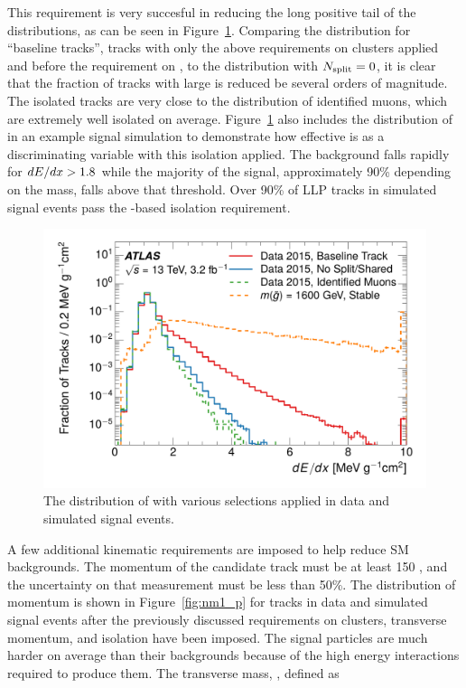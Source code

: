 This requirement is very succesful in reducing the long positive tail of the \dedx distributions, as can be seen in Figure~\ref{fig:dedx_isolation}.
Comparing the distribution for ``baseline tracks'', tracks with only the above requirements on clusters applied and before the requirement on \Nsplit, to the distribution with $N_{\mathrm{split}} = 0$, it is clear that the fraction of tracks with large \dedx is reduced be several orders of magnitude.
The isolated tracks are very close to the \dedx distribution of identified muons, which are extremely well isolated on average. 
Figure~\ref{fig:dedx_isolation} also includes the distribution of \dedx in an example signal simulation to demonstrate how effective \dedx is as a discriminating variable with this isolation applied. 
The background falls rapidly for $dE/dx > 1.8$ \MeVgcm while the majority of the signal, approximately 90\% depending on the mass, falls above that threshold.
Over 90\% of \ac{LLP} tracks in simulated signal events pass the \Nsplit-based isolation requirement.


\begin{figure}[h]
\centering
\includegraphics[width=\fullfig]{figures/dedx_isolation.pdf}
\caption{The distribution of \dedx with various selections applied in data and simulated signal events.}
\label{fig:dedx_isolation}
\end{figure}

A few additional kinematic requirements are imposed to help reduce \ac{SM} backgrounds. 
The momentum of the candidate track must be at least 150 \GeV, and the uncertainty on that measurement must be less than 50\%. 
The distribution of momentum is shown in Figure~\ref{fig:nm1_p} for tracks in data and simulated signal events after the previously discussed requirements on clusters, transverse momentum, and isolation have been imposed.
The signal particles are much harder on average than their backgrounds because of the high energy interactions required to produce them.
The transverse mass, \mt, defined as 

